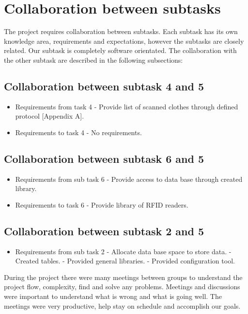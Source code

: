 %
\section{Collaboration between subtasks}

The project requires collaboration between subtasks. Each subtask has its own knowledge area, requirements and expectations, however the subtasks are closely related. Our subtask is completely software orientated. The collaboration with the other subtask are described in the following subsections:

\subsection{Collaboration between subtask 4 and 5}
\begin{itemize}
	\item Requirements from task 4
	\subitem - Provide list of scanned clothes through defined protocol [Appendix A].
	\item Requirements to task 4
	\subitem - No requirements.
\end{itemize}

\subsection{Collaboration between subtask 6 and 5}
\begin{itemize}
	\item Requirements from sub task 6
	\subitem - Provide access to data base through created library.
	\item Requirements to task 6
	\subitem - Provide library of RFID readers.
\end{itemize}

\subsection{Collaboration between subtask 2 and 5}
\begin{itemize}
	\item Requirements from sub task 2
	\subitem - Allocate data base space to store data.
	\subitem - Created tables.
	\subitem - Provided general libraries.
	\subitem - Provided configuration tool.
\end{itemize}

During the project there were many meetings between groups to understand the project flow, complexity, find and solve any problems. Meetings and discussions were important to understand what is wrong and what is going well. The meetings were very productive, help stay on schedule and accomplish our goals.